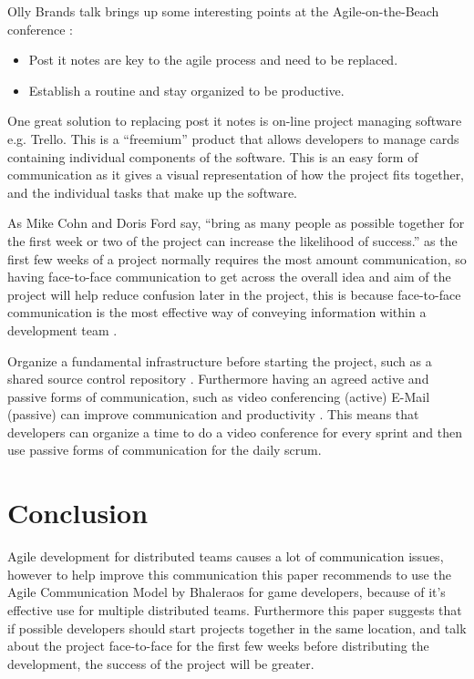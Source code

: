 \documentclass{scrartcl}
\begin{document}
Olly Brands talk brings up some interesting points at the Agile-on-the-Beach conference \cite{OllyBrandLiveBlog2015}:

\begin{itemize}
\item Post it notes are key to the agile process and need to be replaced. 
\item Establish a routine and stay organized to be productive. 
\end{itemize}

One great solution to replacing post it notes is on-line project managing software e.g. Trello. This is a ``freemium'' product that allows developers to manage cards containing individual components of the software. This is an easy form of communication as it gives a visual representation of how the project fits together, and the individual tasks that make up the software.

As Mike Cohn and Doris Ford say, ``bring as many people as possible together for the first week or two of the project can increase the likelihood of success.'' \cite{cohn2003} as the first few weeks of a project normally requires the most amount communication, so having face-to-face communication to get across the overall idea and aim of the project will help reduce confusion later in the project, this is because face-to-face communication is the most effective way of conveying information within a development team \cite{williams2012}.


Organize a fundamental infrastructure before starting the project, such as a shared source control repository \cite{dinakar2009}. Furthermore having an agreed active and passive forms of communication, such as video conferencing (active) E-Mail (passive) can improve communication and productivity \cite{joshi2013}. This means that developers can organize a time to do a video conference for every sprint and then use passive forms of communication for the daily scrum.


\section{Conclusion}

Agile development for distributed teams causes a lot of communication issues, however to help improve this communication this paper recommends to use the Agile Communication Model by Bhaleraos \cite{bhalerao2010} for game developers, because of it's effective use for multiple distributed teams. Furthermore this paper suggests that if possible developers should start projects together in the same location, and talk about the project face-to-face for the first few weeks before distributing the development, the success of the project will be greater.




\end{document}

